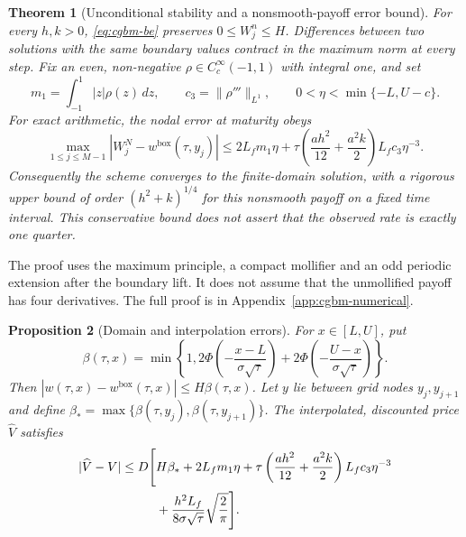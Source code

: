 \documentclass[11pt]{article}
\newtheorem{theorem}{Theorem}[section]
\newtheorem{proposition}[theorem]{Proposition}
\begin{document}
\begin{theorem}[Unconditional stability and a nonsmooth-payoff error bound]
\label{thm:cgbm-be}
For every $h,k>0$, \eqref{eq:cgbm-be} preserves $0\leq W_j^n\leq H$.
Differences between two solutions with the same boundary values contract
in the maximum norm at every step. Fix an even, non-negative
$\rho\in C_c^\infty(-1,1)$ with integral one, and set
\begin{equation}
 m_1=\int_{-1}^1|z|\rho(z)\,dz,\qquad
 c_3=\|\rho'''\|_{L^1},\qquad
 0<\eta<\min\{-L,U-c\}.
 \label{eq:cgbm-mollifier}
\end{equation}
For exact arithmetic, the nodal error at maturity obeys
\begin{equation}
 \max_{1\leq j\leq M-1}
 |W_j^N-w^{\mathrm{box}}(\tau,y_j)|
 \leq 2L_fm_1\eta
 +\tau\left(\frac{ah^2}{12}+\frac{a^2k}{2}\right)
 L_f c_3\eta^{-3}.
 \label{eq:cgbm-be-error}
\end{equation}
Consequently the scheme converges to the finite-domain solution, with
a rigorous upper bound of order $(h^2+k)^{1/4}$ for this nonsmooth payoff
on a fixed time interval. This conservative bound does not assert that
the observed rate is exactly one quarter.
\end{theorem}

The proof uses the maximum principle, a compact mollifier and an odd
periodic extension after the boundary lift. It does not assume that the
unmollified payoff has four derivatives. The full proof is in
Appendix~\ref{app:cgbm-numerical}.

\begin{proposition}[Domain and interpolation errors]
\label{prop:cgbm-domain}
For $x\in[L,U]$, put
\begin{equation}
 \beta(\tau,x)=\min\!\left\{1,
 2\Phi\!\left(-\frac{x-L}{\sigma\sqrt{\tau}}\right)
 +2\Phi\!\left(-\frac{U-x}{\sigma\sqrt{\tau}}\right)\right\}.
 \label{eq:cgbm-domain-beta}
\end{equation}
Then $|w(\tau,x)-w^{\mathrm{box}}(\tau,x)|\leq H\beta(\tau,x)$.
Let $y$ lie between grid nodes $y_j,y_{j+1}$ and define
$\beta_* =\max\{\beta(\tau,y_j),\beta(\tau,y_{j+1})\}$.
The interpolated, discounted price $\widehat V$ satisfies
\begin{align}
 |\widehat V-V|\leq D\Bigg[
 &H\beta_*+2L_fm_1\eta
 +\tau\left(\frac{ah^2}{12}+\frac{a^2k}{2}\right)
 L_f c_3\eta^{-3}\notag\\
 &+\frac{h^2 L_f}{8\sigma\sqrt{\tau}}
 \sqrt{\frac{2}{\pi}}\Bigg].
 \label{eq:cgbm-total-error}
\end{align}
\end{proposition}
\end{document}
